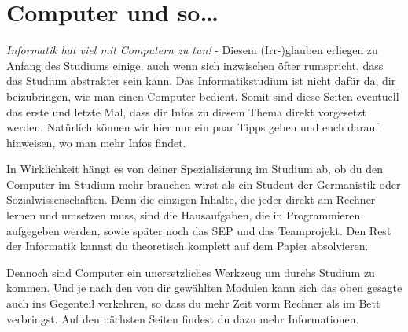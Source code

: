 \section{Computer und so\ldots}
	\label{computer}
	\emph{Informatik hat viel mit Computern zu tun!} - Diesem (Irr-)glauben erliegen zu Anfang des Studiums einige, auch wenn sich inzwischen öfter rumspricht, dass das Studium abstrakter sein kann. Das Informatikstudium ist nicht dafür da, dir beizubringen, wie man einen Computer bedient. Somit sind diese Seiten eventuell das erste und letzte Mal,  dass dir Infos zu diesem Thema direkt vorgesetzt werden. Natürlich können wir hier nur ein paar Tipps geben und euch darauf hinweisen, wo man mehr Infos  findet.

	In Wirklichkeit hängt es von deiner Spezialisierung im Studium ab, ob  du den Computer im Studium mehr brauchen wirst als ein Student der Germanistik oder Sozialwissenschaften. Denn die einzigen Inhalte,  die jeder direkt am Rechner lernen und umsetzen muss, sind die Hausaufgaben,  die in Programmieren aufgegeben werden, sowie später noch das SEP und das Teamprojekt. Den Rest der Informatik kannst du theoretisch komplett auf dem Papier absolvieren.

	Dennoch sind Computer ein unersetzliches Werkzeug um durchs Studium zu kommen. Und je nach den von dir gewählten Modulen kann sich das oben gesagte auch ins Gegenteil verkehren, so dass du mehr Zeit vorm Rechner als im Bett verbringst. Auf den nächsten Seiten findest du dazu mehr Informationen.





